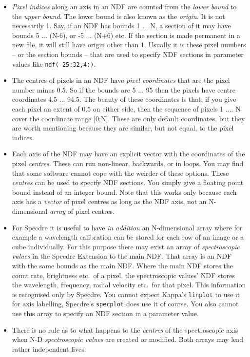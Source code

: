 \begin{itemize}
\item {\it Pixel indices} along an axis in an NDF are counted from the
   {\it lower bound} to the {\it upper bound}.  The lower bound is also
   known as the {\it origin}.  It is not necessarily 1.  Say, if an NDF
   has bounds 1 ... N, a section of it may have bounds 5 ... (N-6), or
   -5 ... (N+6) etc.  If the section is made permanent in a new file, it
   will still have origin other than 1.  Usually it is these pixel
   numbers -- or the section bounds -- that are used to specify NDF
   sections in parameter values like {\tt ndf(-25:32,4:)}.

\item The centres of pixels in an NDF have {\it pixel coordinates} that
   are the pixel number minus 0.5.  So if the bounds are 5 ... 95 then
   the pixels have centre coordinates 4.5 ... 94.5.  The beauty of
   these coordinates is that, if you give each pixel an extent of
   0.5 on either side, then the sequence of pixels 1 .... N cover the
   coordinate range [0;N].  These are only default coordinates, but
   they are worth mentioning because they are similar, but not equal, to
   the pixel indices.

\item Each axis of the NDF may have an explicit vector with the
   coordinates of the pixel {\it centres}.  These can run non-linear,
   backwards, or in loops.  You may find that some software cannot cope
   with the weirder of these options.  These {\it centres} can be used
   to specify NDF sections.  You simply give a floating point bound
   instead of an integer bound.  Note that this works only because each
   axis has a {\it vector} of pixel centres as long as the NDF axis, not
   an N-dimensional {\it array} of pixel centres.

\item For Specdre it is useful to have {\it in addition} an
   N-dimensional array where for example a wavelength calibration can be
   stored for each row of an image or a cube individually.  For this
   purpose there may exist an array of {\it spectroscopic values} in the
   Specdre Extension to the main NDF.  That array is an NDF with the
   same bounds as the main NDF.  Where the main NDF stores the count
   rate, brightness etc.\ of a pixel, the spectroscopic values' NDF
   stores the wavelength, frequency, radial velocity etc.\ for that
   pixel.  This information is recognised only by Specdre.  You cannot
   expect Kappa's {\tt linplot} to use it for axis labelling, Specdre's
   {\tt specplot} does use it of course.  You also cannot use this array
   to specify an NDF section in a parameter value.

\item There is no rule as to what happens to the {\it centres} of the
   spectroscopic axis when N-D {\it spectroscopic values} are created or
   modified.  Both arrays may lead rather independent lives.
\end{itemize}

